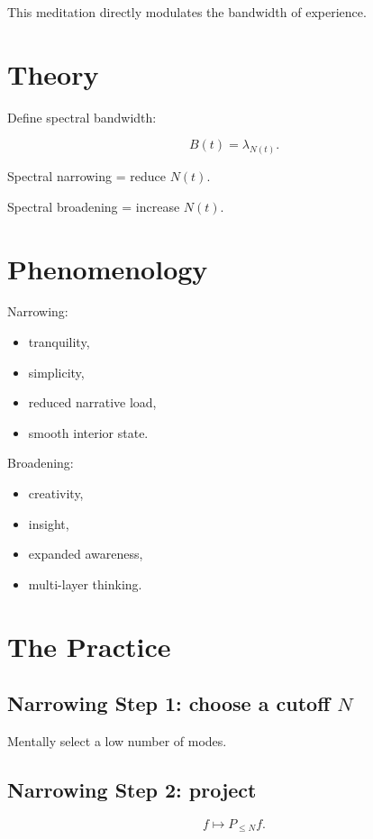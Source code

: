\documentclass[12pt]{article}
\begin{document}
This meditation directly modulates the bandwidth of experience.

\section{Theory}

Define spectral bandwidth:

\[
B(t) = \lambda_{N(t)}.
\]

Spectral narrowing = reduce $N(t)$.

Spectral broadening = increase $N(t)$.

\section{Phenomenology}

Narrowing:

\begin{itemize}
    \item tranquility,
    \item simplicity,
    \item reduced narrative load,
    \item smooth interior state.
\end{itemize}

Broadening:

\begin{itemize}
    \item creativity,
    \item insight,
    \item expanded awareness,
    \item multi-layer thinking.
\end{itemize}

\section{The Practice}

\subsection*{Narrowing Step 1: choose a cutoff $N$}

Mentally select a low number of modes.

\subsection*{Narrowing Step 2: project}

\[
f \mapsto P_{\le N} f.
\]
\end{document}
